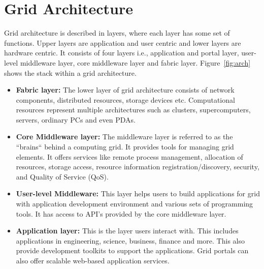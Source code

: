 \section{Grid Architecture}
Grid architecture \cite{buyya2005gentle} is described in layers, where each layer has some set of functions. Upper layers are application and user centric and lower layers are hardware centric. It consists of four layers i.e., application and portal layer, user-level middleware layer, core middleware layer and fabric layer. Figure~\ref{fig:arch} shows the stack within a grid architecture.
\begin{itemize}
 \item \textbf{Fabric layer:} The lower layer of grid architecture consists of network components, distributed resources, storage devices etc. Computational resources represent multiple architectures such as clusters, supercomputers, servers, ordinary PCs and even PDAs.
 \item \textbf{Core Middleware layer:} The middleware layer is referred to as the ``brains`` behind a computing grid. It provides tools for managing grid elements. It offers services like remote process management, allocation of resources, storage access, resource information registration/discovery, security, and Quality of Service (QoS).
 \item \textbf{User-level Middleware:} This layer helps users to build applications for grid with application development environment and various sets of programming tools. It has access to API's provided by the core middleware layer. 
\item \textbf{Application layer:} This is the layer users interact with. This includes applications in engineering, science, business, finance and more. This also provide development toolkits to support the applications. Grid portals can also offer scalable web-based application services. 
\end{itemize}

